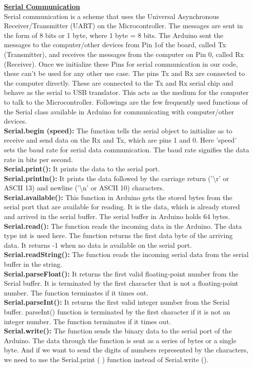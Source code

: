 \documentclass[12pt,a4paper]{article}
\begin{document}
\begin{justify}
\noindent \textbf{\underline{Serial Communication}}\\[6pt]
Serial communication is a scheme that uses the Universal Asynchronous Receiver/Transmitter (UART) on the Microcontroller. The messages are sent in the form of 8 bits or 1 byte, where 1 byte = 8 bits.
The Arduino sent the messages to the computer/other devices from Pin 1of the board, called Tx (Transmitter), and receives the messages from the computer on Pin 0, called Rx (Receiver).
Once we initialize these Pins for serial communication in our code, these can't be used for any other use case. The pins Tx and Rx are connected to the computer directly. These are connected to the Tx and Rx serial chip and behave as the serial to USB translator. This acts as the medium for the computer to talk to the Microcontroller. 
Followings are the few frequently used functions of the Serial class available in Arduino for communicating with computer/other devices.\\[6pt]
\textbf{Serial.begin (speed):} The function tells the serial object to initialize as to receive and send data on the Rx and Tx, which are pins 1 and 0. Here 'speed' sets the baud rate for serial data communication. The baud rate signifies the data rate in bits per second.\\[6pt]
\textbf{Serial.print():} It prints the data to the serial port.\\[6pt]
\textbf{Serial.println():} It prints the data followed by the carriage return ('\textbackslash r' or ASCII 13) and newline ('\textbackslash n' or ASCII 10) characters. \\[6pt]
\textbf{Serial.available():} This function in Arduino gets the stored bytes from the serial port that are available for reading. It is the data, which is already stored and arrived in the serial buffer. The serial buffer in Arduino holds 64 bytes.\\[6pt]
\textbf{Serial.read():} The function reads the incoming data in the Arduino. The data type int is used here. The function returns the first data byte of the arriving data. It returns -1 when no data is available on the serial port.\\[6pt]
\textbf{Serial.readString():} The function reads the incoming serial data from the serial buffer in the string. \\[6pt]
\textbf{Serial.parseFloat():} It returns the first valid floating-point number from the Serial buffer. It is terminated by the first character that is not a floating-point number. The function terminates if it times out.\\[6pt]
\textbf{Serial.parseInt():} It returns the first valid integer number from the Serial buffer. parseInt() function is terminated by the first character if it is not an integer number. The function terminates if it times out.\\[6pt]
\textbf{Serial.write():} The function sends the binary data to the serial port of the Arduino. The data through the function is sent as a series of bytes or a single byte. And if we want to send the digits of numbers represented by the characters, we need to use the Serial.print ( ) function instead of Serial.write ().



\end{justify}
\end{document}

